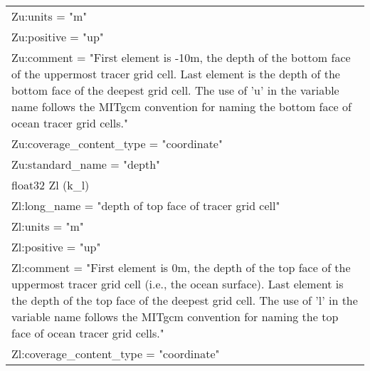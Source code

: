 \begin{longtable}{|p{\textwidth}|}
\rowcolor{Apricot}\hspace{0.5cm}\hspace{0.5cm}Zu:units = "m"\\
\rowcolor{Apricot}\hspace{0.5cm}\hspace{0.5cm}Zu:positive = "up"\\
\rowcolor{Apricot}\hspace{0.5cm}\hspace{0.5cm}Zu:comment = "First element is -10m, the depth of the bottom face of the uppermost tracer grid cell. Last element is the depth of the bottom face of the deepest grid cell. The use of 'u' in the variable name follows the MITgcm convention for naming the bottom face of ocean tracer grid cells."\\
\rowcolor{Apricot}\hspace{0.5cm}\hspace{0.5cm}Zu:coverage\_content\_type = "coordinate"\\
\rowcolor{Apricot}\hspace{0.5cm}\hspace{0.5cm}Zu:standard\_name = "depth"\\
\rowcolor{Apricot}\hspace{0.5cm}float32 Zl (k\_l)\\
\rowcolor{Apricot}\hspace{0.5cm}\hspace{0.5cm}Zl:long\_name = "depth of top face of tracer grid cell"\\
\rowcolor{Apricot}\hspace{0.5cm}\hspace{0.5cm}Zl:units = "m"\\
\rowcolor{Apricot}\hspace{0.5cm}\hspace{0.5cm}Zl:positive = "up"\\
\rowcolor{Apricot}\hspace{0.5cm}\hspace{0.5cm}Zl:comment = "First element is 0m, the depth of the top face of the uppermost tracer grid cell (i.e., the ocean surface). Last element is the depth of the top face of the deepest grid cell. The use of 'l' in the variable name follows the MITgcm convention for naming the top face of ocean tracer grid cells."\\
\rowcolor{Apricot}\hspace{0.5cm}\hspace{0.5cm}Zl:coverage\_content\_type = "coordinate"\\

\end{longtable}
